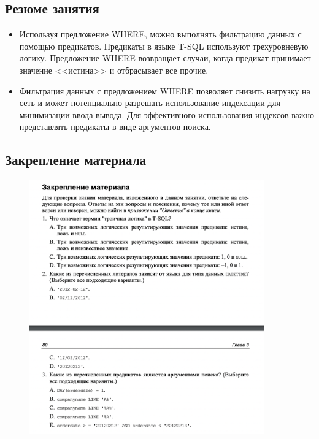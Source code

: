 \subsection*{Резюме занятия}
\begin{itemize}
	\item Используя предложение WHERE, можно выполнять фильтрацию данных с помощью предикатов. Предикаты в языке T-SQL используют трехуровневую логику. Предложение WHERE возвращает случаи, когда предикат принимает значение <<истина>> и отбрасывает все прочие. 
	\item Фильтрация данных с предложением WHERE позволяет снизить нагрузку на сеть и
	может потенциально разрешать использование индексации для минимизации
	ввода-вывода. Для эффективного использования индексов важно представлять
	предикаты в виде аргументов поиска. 
\end{itemize}



\subsection*{Закрепление материала}

\begin{figure}[h!]
	\begin{center}
		\includegraphics[width=0.9\textwidth]{img/zakrep5.png}
	\end{center}
	\captionsetup{justification=centering}
\end{figure}
\newpage

